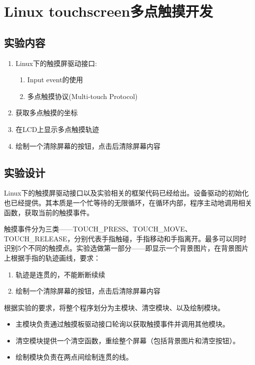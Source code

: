 \documentclass{report}
\begin{document}
\chapter{Linux touchscreen多点触摸开发}
\section{实验内容}
\begin{enumerate}
    \item Linux下的触摸屏驱动接口:
        \begin{enumerate}
            \item Input event的使用
            \item 多点触摸协议(Multi-touch Protocol)
        \end{enumerate}
    \item 获取多点触摸的坐标
    \item 在LCD上显示多点触摸轨迹
    \item 绘制一个清除屏幕的按钮，点击后清除屏幕内容
\end{enumerate}
\section{实验设计}
\par Linux下的触摸屏驱动接口以及实验相关的框架代码已经给出。设备驱动的初始化也已经提供。其本质是一个忙等待的无限循环，在循环内部，程序主动地调用相关函数，获取当前的触摸事件。
\par 触摸事件分为三类——TOUCH\_PRESS、TOUCH\_MOVE、TOUCH\_RELEASE，分别代表手指触碰，手指移动和手指离开。最多可以同时识别5个不同的触摸点。实验选做第一部分——即显示一个背景图片，在背景图片上根据手指的轨迹画线，要求：
\begin{enumerate}
    \item 轨迹是连贯的，不能断断续续
    \item 绘制一个清除屏幕的按钮，点击后清除屏幕内容
\end{enumerate}
根据实验的要求，将整个程序划分为主模块、清空模块、以及绘制模块。

\begin{itemize}
    \item 主模块负责通过触摸板驱动接口轮询以获取触摸事件并调用其他模块。
    \item 清空模块提供一个清空函数，重绘整个屏幕（包括背景图片和清空按钮）。
    \item 绘制模块负责在两点间绘制连贯的线。
\end{itemize}
\end{document}
